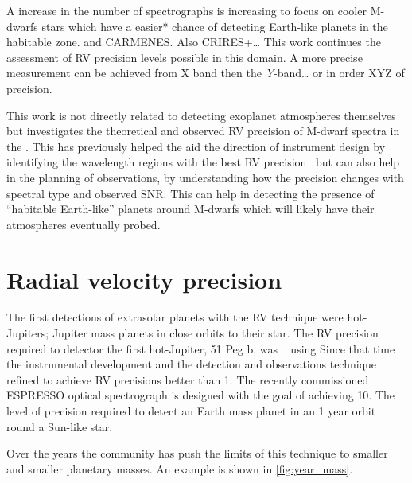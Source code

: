 A increase in the number of \nir{} spectrographs is increasing to focus on cooler {M-dwarfs} stars which have a easier* chance of detecting Earth-like planets in the habitable zone.  and {CARMENES}.
Also {CRIRES+}\ldots{}
This work continues the assessment of {RV} precision levels possible in this domain.
 A more precise measurement can be achieved from X band then the \emph{Y}-band\ldots{} or in order XYZ of precision.




This work is not directly related to detecting exoplanet atmospheres themselves but investigates the theoretical and observed {RV} precision of {M-dwarf} spectra in the \nir{}.
This has previously helped the aid the direction of instrument design by identifying the wavelength regions with the best {RV} precision~\citep{figueira_radial_2016} but can also help in the planning of observations, by understanding how the precision changes with spectral type and observed {SNR}.
This can help in detecting the presence of ``habitable Earth-like'' planets around {M-dwarfs} which will likely have their atmospheres eventually probed.


\section{Radial velocity precision}
The first detections of extrasolar planets with the {RV} technique were hot-Jupiters; Jupiter mass planets in close orbits to their star.
The RV precision required to detector the first hot-Jupiter, 51 Peg b, was ~\cite{mayor_jupitermass_1995} using  Since that time the instrumental development and the detection and observations technique refined to achieve {RV} precisions better than 1\mps{}.
The recently commissioned ESPRESSO optical spectrograph is designed with the goal of achieving 10\cmps{}.
The level of precision required to detect an Earth mass planet in an 1 year orbit round a Sun-like star.

Over the years the community has push the limits of this technique to smaller and smaller planetary masses.
An example is shown in \cref{fig:year_mass}.

